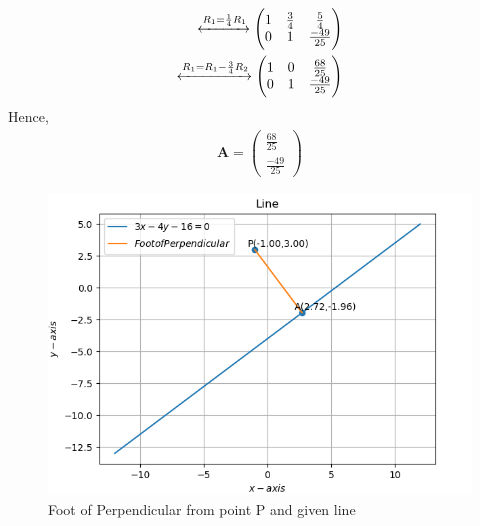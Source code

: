 \documentclass[12pt]{article}
\let\vec\mathbf
\newcommand{\myvec}[1]{\ensuremath{\begin{pmatrix}#1\end{pmatrix}}}
\let\vec\mathbf
\begin{document}
\begin{enumerate}
\begin{align}
  \xleftrightarrow{R_1=\frac{1}{4}R_1}
  \myvec{
  1 & \frac{3}{4} & \frac{5}{4}\\
  0 & 1 & \frac{-49}{25}}
\\
  \xleftrightarrow{R_1=R_1-\frac{3}{4}R_2}
  \myvec{
  1 & 0 & \frac{68}{25}\\
  0 & 1 & \frac{-49}{25}}          
\end{align}
Hence,
\begin{align}
\vec{A}=\myvec{
\frac{68}{25}\\[1pt]
\frac{-49}{25}
}
\end{align}
\begin{figure}[!h]
	\begin{center} 
	    \includegraphics[width=\columnwidth]{figs/lines.png}
	\end{center}
\caption{Foot of Perpendicular from point P and given line}
\label{fig:Fig}
\end{figure}
\end{enumerate}
\end{document}
